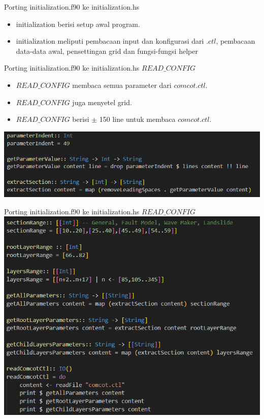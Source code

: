 \documentclass{beamer}
\begin{document}
\begin{frame}{Porting initialization.f90 ke initialization.hs}
    \begin{itemize}
        \item initialization berisi setup awal program.
        \item initialization meliputi pembacaan input dan konfigurasi dari $.ctl$, 
        pembacaan data-data awal, pensettingan grid dan fungsi-fungsi helper
    \end{itemize}
\end{frame}

\begin{frame}{Porting initialization.f90 ke initialization.hs}
    $READ\_CONFIG$
    \begin{itemize}
        \item $READ\_CONFIG$ membaca semua parameter dari $comcot.ctl$.
        \item $READ\_CONFIG$ juga menyetel grid.
        \item $READ\_CONFIG$ berisi $\pm$ 150 line untuk membaca $comcot.ctl$.
    \end{itemize}
    \includegraphics[scale=0.5]{figure/read_config_2.png}
        
\end{frame}

\begin{frame}{Porting initialization.f90 ke initialization.hs}
    $READ\_CONFIG$
    \includegraphics[scale=0.5]{figure/read_config_1.png}
\end{frame}
\end{document}
